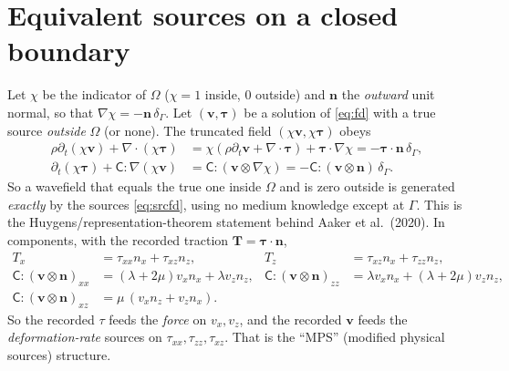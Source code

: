 \documentclass[11pt,a4paper]{article}
\newcommand{\vv}{\mathbf v}
\newcommand{\nn}{\mathbf n}
\newcommand{\Cm}{\mathsf C}
\newcommand{\dd}{\partial}
\begin{document}
\section{Equivalent sources on a closed boundary}
Let $\chi$ be the indicator of $\Omega$ ($\chi=1$ inside, $0$ outside) and
$\nn$ the \emph{outward} unit normal, so that $\nabla\chi=-\nn\,\delta_\Gamma$.
Let $(\vv,\bm\tau)$ be a solution of \eqref{eq:fd} with a true source
\emph{outside} $\Omega$ (or none). The truncated field $(\chi\vv,\chi\bm\tau)$ obeys
\begin{align}
\rho\dd_t(\chi\vv)+\nabla\!\cdot(\chi\bm\tau)&=\chi(\rho\dd_t\vv+\nabla\!\cdot\bm\tau)+\bm\tau\!\cdot\nabla\chi
=-\bm\tau\!\cdot\nn\,\delta_\Gamma,\\
\dd_t(\chi\bm\tau)+\Cm:\nabla(\chi\vv)&=\Cm:(\vv\otimes\nabla\chi)
=-\Cm:(\vv\otimes\nn)\,\delta_\Gamma .
\end{align}
So a wavefield that equals the true one inside $\Omega$ and is zero outside is
generated \emph{exactly} by the sources \eqref{eq:srcfd}, using no medium
knowledge except at $\Gamma$. This is the Huygens/representation-theorem
statement behind Aaker et al.\ (2020). In components, with the recorded
traction $\bm T=\bm\tau\!\cdot\nn$,
\begin{align}
T_x&=\tau_{xx}n_x+\tau_{xz}n_z, & T_z&=\tau_{xz}n_x+\tau_{zz}n_z,\\
\Cm:(\vv\otimes\nn)_{xx}&=(\lambda{+}2\mu)v_xn_x+\lambda v_zn_z, &
\Cm:(\vv\otimes\nn)_{zz}&=\lambda v_xn_x+(\lambda{+}2\mu)v_zn_z,\\
\Cm:(\vv\otimes\nn)_{xz}&=\mu\,(v_xn_z+v_zn_x). &&
\end{align}
So the recorded $\tau$ feeds the \emph{force} on $v_x,v_z$, and the recorded $\vv$
feeds the \emph{deformation-rate} sources on $\tau_{xx},\tau_{zz},\tau_{xz}$.
That is the ``MPS'' (modified physical sources) structure.
\end{document}
